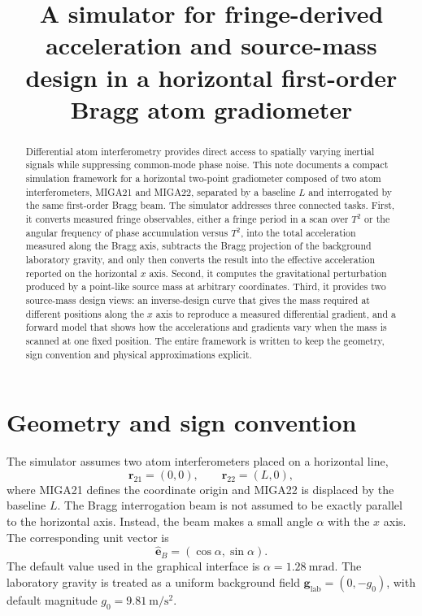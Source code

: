 \documentclass[11pt]{article}
\title{A simulator for fringe-derived acceleration and source-mass design in a horizontal first-order Bragg atom gradiometer}
\author{}
\date{}
\begin{document}
\maketitle

\begin{abstract}
Differential atom interferometry provides direct access to spatially varying inertial signals while suppressing common-mode phase noise. This note documents a compact simulation framework for a horizontal two-point gradiometer composed of two atom interferometers, MIGA21 and MIGA22, separated by a baseline $L$ and interrogated by the same first-order Bragg beam. The simulator addresses three connected tasks. First, it converts measured fringe observables, either a fringe period in a scan over $T^2$ or the angular frequency of phase accumulation versus $T^2$, into the total acceleration measured along the Bragg axis, subtracts the Bragg projection of the background laboratory gravity, and only then converts the result into the effective acceleration reported on the horizontal $x$ axis. Second, it computes the gravitational perturbation produced by a point-like source mass at arbitrary coordinates. Third, it provides two source-mass design views: an inverse-design curve that gives the mass required at different positions along the $x$ axis to reproduce a measured differential gradient, and a forward model that shows how the accelerations and gradients vary when the mass is scanned at one fixed position. The entire framework is written to keep the geometry, sign convention and physical approximations explicit.
\end{abstract}

\section{Geometry and sign convention}

The simulator assumes two atom interferometers placed on a horizontal line,
\begin{equation}
\mathbf{r}_{21} = (0,0),
\qquad
\mathbf{r}_{22} = (L,0),
\end{equation}
where MIGA21 defines the coordinate origin and MIGA22 is displaced by the baseline $L$. The Bragg interrogation beam is not assumed to be exactly parallel to the horizontal axis. Instead, the beam makes a small angle $\alpha$ with the $x$ axis. The corresponding unit vector is
\begin{equation}
\hat{\mathbf{e}}_{B} = (\cos\alpha, \sin\alpha).
\end{equation}
The default value used in the graphical interface is $\alpha = 1.28~\mathrm{mrad}$. The laboratory gravity is treated as a uniform background field $\mathbf{g}_{\mathrm{lab}} = (0,-g_0)$, with default magnitude $g_0 = 9.81~\mathrm{m/s^2}$. 
\end{document}
